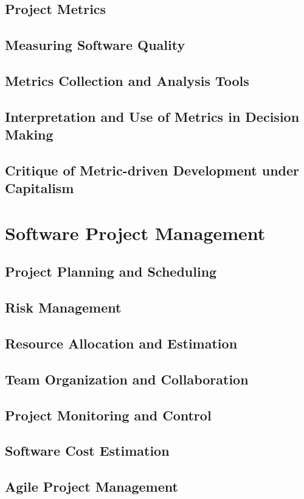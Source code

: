 \begin{refsection}
\subsection{Project Metrics}
\subsection{Measuring Software Quality}
\subsection{Metrics Collection and Analysis Tools}
\subsection{Interpretation and Use of Metrics in Decision Making}
\subsection{Critique of Metric-driven Development under Capitalism}

\newpage

\section{Software Project Management}
\subsection{Project Planning and Scheduling}
\subsection{Risk Management}
\subsection{Resource Allocation and Estimation}
\subsection{Team Organization and Collaboration}
\subsection{Project Monitoring and Control}
\subsection{Software Cost Estimation}
\subsection{Agile Project Management}

\end{refsection}
